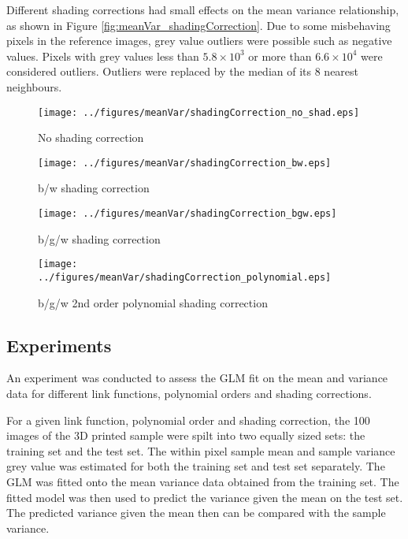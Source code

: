 \documentclass[a4paper]{proc}
\begin{document}
Different shading corrections had small effects on the mean variance relationship, as shown in Figure \ref{fig:meanVar_shadingCorrection}. Due to some misbehaving pixels in the reference images, grey value outliers were possible such as negative values. Pixels with grey values less than $5.8\times 10^3$ or more than $6.6\times 10^4$ were considered outliers. Outliers were replaced by the median of its 8 nearest neighbours.

\begin{figure*}
	\centering
	\begin{subfigure}{0.45\textwidth}
		\centering
		\texttt{[image: ../figures/meanVar/shadingCorrection\_no\_shad.eps]}
		\caption{No shading correction}
	\end{subfigure}
	\begin{subfigure}{0.45\textwidth}
		\centering
		\texttt{[image: ../figures/meanVar/shadingCorrection\_bw.eps]}
		\caption{b/w shading correction}
	\end{subfigure}
	\begin{subfigure}{0.45\textwidth}
		\centering
		\texttt{[image: ../figures/meanVar/shadingCorrection\_bgw.eps]}
		\caption{b/g/w shading correction}
	\end{subfigure}
	\begin{subfigure}{0.45\textwidth}
		\centering
		\texttt{[image: ../figures/meanVar/shadingCorrection\_polynomial.eps]}
		\caption{b/g/w 2nd order polynomial shading correction}
	\end{subfigure}
	\caption{Post shading correction mean and variance frequency density plot of each pixel's grey value in the segmented image of the 3D printed sample. A Gamma GLM was fitted with the identity link. The solid and dotted lines are the mean response and the $\Phi(\pm 1)$ quantiles respectively.}
	\label{fig:meanVar_shadingCorrection}
\end{figure*}

\subsection{Experiments}

An experiment was conducted to assess the GLM fit on the mean and variance data for different link functions, polynomial orders and shading corrections.

For a given link function, polynomial order and shading correction, the 100 images of the 3D printed sample were spilt into two equally sized sets: the training set and the test set. The within pixel sample mean and sample variance  grey value was estimated for both the training set and test set separately. The GLM was fitted onto the mean variance data obtained from the training set. The fitted model was then used to predict the variance given the mean on the test set. The predicted variance given the mean then can be compared with the sample variance.
\end{document}
